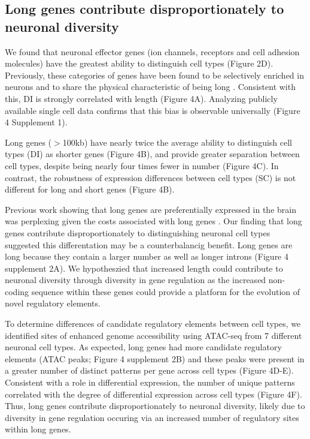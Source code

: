 \subsection{Long genes contribute disproportionately to neuronal diversity}

We found that neuronal effector genes (ion channels, receptors and cell adhesion molecules) have the greatest ability to distinguish cell types (Figure 2D). Previously, these categories of genes have been found to be selectively enriched in neurons and to share the physical characteristic of being long \citep{Sugino_2014,Gabel_2015,Zylka_2015}. Consistent with this, DI is strongly correlated with length (Figure 4A). Analyzing publicly available single cell data confirms that this bias is observable universally (Figure 4 Supplement 1). 

Long genes ($\gt$100kb) have nearly twice the average ability to distinguish cell types (DI) as shorter genes (Figure 4B), and provide greater separation between cell types, despite being nearly four times fewer in number (Figure 4C). In contrast, the robustness of expression differences between cell types (SC) is not different for long and short genes (Figure 4B). 

Previous work showing that long genes are preferentially expressed in the brain was perplexing given the costs associated with long genes \cite{Castillo_Davis_2002}. Our finding that long genes contribute disproportionately to distinguishing neuronal cell types suggested this differentation may be a counterbalancig benefit. Long genes are long because they contain a larger number as well as longer introns (Figure 4 supplement 2A). We hypotheszied that increased length could contribute to neuronal diversity through diversity in gene regulation as the increased non-coding sequence within these genes could provide a platform for the evolution of novel regulatory elements.

To determine differences of candidate regulatory elements between cell types, we identified sites of enhanced genome accessibility using ATAC-seq \cite{Buenrostro_2013} from 7 different neuronal cell types. As expected, long genes had more candidate regulatory elements (ATAC peaks; Figure 4 supplement 2B) and these peaks were present in a greater number of distinct patterns per gene across cell types (Figure 4D-E). Consistent with a role in differential expression, the number of unique patterns correlated with the degree of differential expression across cell types (Figure 4F). Thus, long genes contribute disproportionately to neuronal diversity, likely due to diversity in gene regulation occuring via an increased number of regulatory sites within long genes. 


